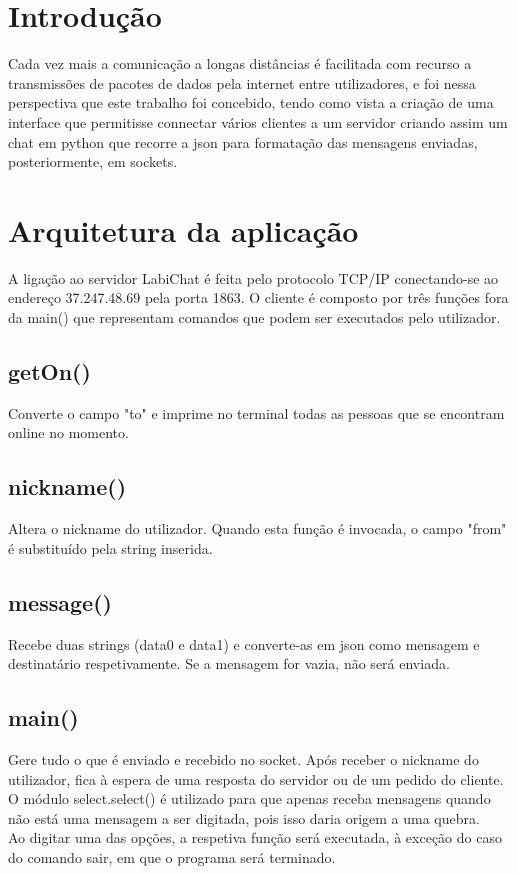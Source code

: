 \documentclass{report}
\begin{document}
\tableofcontents


\clearpage
{}

\chapter{Introdução}
\label{chap.introducao}

Cada vez mais a comunicação a longas distâncias é facilitada com recurso a transmissões de pacotes de dados pela internet entre utilizadores, e foi nessa perspectiva que este trabalho foi concebido, tendo como vista a criação de uma interface que permitisse connectar vários clientes a um servidor criando assim um chat em python que recorre a json para formatação das mensagens enviadas, posteriormente, em sockets.

\chapter{Arquitetura da aplicação}
\label{chap.arquitetura}

A ligação ao servidor LabiChat é feita pelo protocolo TCP/IP conectando-se ao endereço 37.247.48.69 pela porta 1863. O cliente é composto por três funções fora da main() que representam comandos que podem ser executados pelo utilizador.

\section{getOn()}
Converte o campo "to" e imprime no terminal todas as pessoas que se encontram online no momento.

\section{nickname()}
Altera o nickname do utilizador. Quando esta função é invocada, o campo "from" é substituído pela string inserida.

\section{message()}
Recebe duas strings (data0 e data1) e converte-as em json como mensagem e destinatário respetivamente. Se a mensagem for vazia, não será enviada.

\section{main()}
Gere tudo o que é enviado e recebido no socket. Após receber o nickname do utilizador, fica à espera de uma resposta do servidor ou de um pedido do cliente. O módulo select.select() é utilizado para que apenas receba mensagens quando não está uma mensagem a ser digitada, pois isso daria origem a uma quebra. \\
Ao digitar uma das opções, a respetiva função será executada, à exceção do caso do comando sair, em que o programa será terminado.
\end{document}
